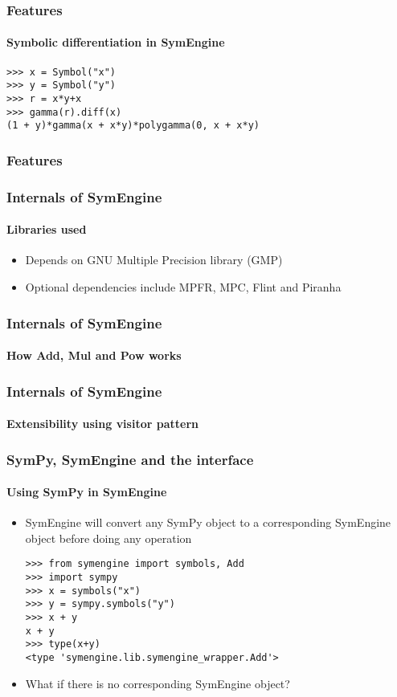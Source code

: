 \documentclass{beamer}
\begin{document}
\begin{frame}[fragile]
\frametitle{Features}
\framesubtitle{Symbolic differentiation in SymEngine}
\begin{verbatim}
>>> x = Symbol("x")
>>> y = Symbol("y")
>>> r = x*y+x
>>> gamma(r).diff(x)
(1 + y)*gamma(x + x*y)*polygamma(0, x + x*y)
\end{verbatim}
\end{frame}


\begin{frame}
\frametitle{Features}
\end{frame}


\begin{frame}
\frametitle{Internals of SymEngine}
\framesubtitle{Libraries used}
\begin{itemize}
\item Depends on GNU Multiple Precision library (GMP)
\item Optional dependencies include MPFR, MPC, Flint and Piranha
\end{itemize}
\end{frame}


\begin{frame}
\frametitle{Internals of SymEngine}
\framesubtitle{How Add, Mul and Pow works}
\end{frame}


\begin{frame}
\frametitle{Internals of SymEngine}
\framesubtitle{Extensibility using visitor pattern}
\end{frame}


\begin{frame}[fragile]
\frametitle{SymPy, SymEngine and the interface}
\framesubtitle{Using SymPy in SymEngine}
\begin{itemize}
\item
SymEngine will convert any SymPy object to a corresponding SymEngine object before doing any operation

\begin{verbatim}
>>> from symengine import symbols, Add
>>> import sympy
>>> x = symbols("x")
>>> y = sympy.symbols("y")
>>> x + y
x + y
>>> type(x+y)
<type 'symengine.lib.symengine_wrapper.Add'>
\end{verbatim}
\item
What if there is no corresponding SymEngine object?
\end{itemize}
\end{frame}
\end{document}
